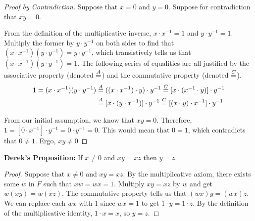 \documentclass[11pt]{article}
\begin{document}
    \begin{proof}[Proof by Contradiction]
        Suppose that $x = 0$ and $y = 0$.
        Suppose for contradiction that $xy = 0$.
        
        From the definition of the multiplicative inverse, $x \cdot x^{-1} = 1$ and $y \cdot y^{-1} = 1$.
        Multiply the former by $y \cdot y^{-1}$ on both sides to find that $(x \cdot x^{-1})(y \cdot y^{-1}) = y \cdot y^{-1}$, which transistively tells us that $(x \cdot x^{-1})(y \cdot y^{-1}) = 1$.
        The following series of equalities are all justified by the associative property (denoted $\overset{A}{=}$) and the commutative property (denoted $\overset{C}{=}$).
        \begin{align}
            1   =   
            (x \cdot x^{-1})(y \cdot y^{-1})    &\overset{A}{=}   ((x \cdot x^{-1}) \cdot y) \cdot y^{-1}
                \overset{C}{=}    [x \cdot (x^{-1} \cdot y)] \cdot y^{-1}\\
                &\overset{A}{=}   [x \cdot (y \cdot x^{-1})] \cdot y^{-1}
                \overset{C}{=}    [(x \cdot y) \cdot x^{-1}] \cdot y^{-1}
        \end{align}

        From our initial assumption, we know that $xy = 0$.
        Therefore, $1 = [0 \cdot x^{-1}] \cdot y^{-1} = 0 \cdot y^{-1} = 0$.
        This would mean that $0 = 1$, which contradicts that $0 \neq 1$.
        Ergo, $xy \neq 0$
    \end{proof}
    \textbf{Derek's Proposition:} If $x \neq 0$ and $xy = xz$ then $y = z$.
    \begin{proof}
        Suppose that $x \neq 0$ and $xy = xz$.
        By the multiplicative axiom, there exists some $w$ in $F$ such that $xw = wx = 1$.
        Multiply $xy = xz$ by $w$ and get $w(xy) = w(xz)$.
        The commutative property tells us that $(wx)y = (wx)z$.
        We can replace each $wx$ with $1$ since $wx = 1$ to get $1 \cdot y = 1 \cdot z$.
        By the definition of the multiplicative identity, $1 \cdot x = x$, so $y = z$.
    \end{proof}
\end{document}
